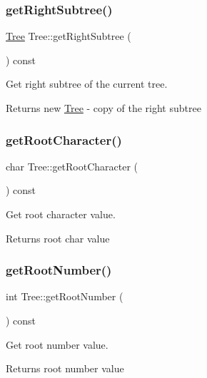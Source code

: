 \subsubsection{\texorpdfstring{getRightSubtree()}{getRightSubtree()}}
{\footnotesize\ttfamily \mbox{\hyperlink{class_tree}{Tree}} Tree\+::get\+Right\+Subtree (\begin{DoxyParamCaption}{ }\end{DoxyParamCaption}) const}



Get right subtree of the current tree. 

\begin{DoxyReturn}{Returns}
new \mbox{\hyperlink{class_tree}{Tree}} -\/ copy of the right subtree 
\end{DoxyReturn}
\mbox{\label{class_tree_aa555328592d942644e3046094dfcb15c}} 
\subsubsection{\texorpdfstring{getRootCharacter()}{getRootCharacter()}}
{\footnotesize\ttfamily char Tree\+::get\+Root\+Character (\begin{DoxyParamCaption}{ }\end{DoxyParamCaption}) const}



Get root character value. 

\begin{DoxyReturn}{Returns}
root char value 
\end{DoxyReturn}
\mbox{\label{class_tree_afddbbbdd7a2b6b94c1fa06421dc3659a}} 
\subsubsection{\texorpdfstring{getRootNumber()}{getRootNumber()}}
{\footnotesize\ttfamily int Tree\+::get\+Root\+Number (\begin{DoxyParamCaption}{ }\end{DoxyParamCaption}) const}



Get root number value. 

\begin{DoxyReturn}{Returns}
root number value 
\end{DoxyReturn}
\mbox{\label{class_tree_aa1109a75294849e0560ff762b5564f64}} 
